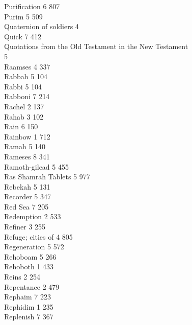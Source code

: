 Purification \hfill 6 \quad \phantom{0}807\\
Purim \hfill 5 \quad \phantom{0}509\\
Quaternion of soldiers \hfill 4 \\
Quick \hfill 7 \quad \phantom{0}412\\
Quotations from the Old Testament in the New Testament \\ \mbox{} \hfill 5 \\
Raamses \hfill 4 \quad \phantom{0}337\\
Rabbah \hfill 5 \quad \phantom{0}104\\
Rabbi \hfill 5 \quad \phantom{0}104\\
Rabboni \hfill 7 \quad \phantom{0}214\\
Rachel \hfill 2 \quad \phantom{0}137\\
Rahab \hfill 3 \quad \phantom{0}102\\
Rain \hfill 6 \quad \phantom{0}150\\
Rainbow \hfill 1 \quad \phantom{0}712\\
Ramah \hfill 5 \quad \phantom{0}140\\
Rameses \hfill 8 \quad \phantom{0}341\\
Ramoth-gilead \hfill 5 \quad \phantom{0}455\\
Ras Shamrah Tablets \hfill 5 \quad \phantom{0}977\\
Rebekah \hfill 5 \quad \phantom{0}131\\
Recorder \hfill 5 \quad \phantom{0}347\\
Red Sea \hfill 7 \quad \phantom{0}205\\
Redemption \hfill 2 \quad \phantom{0}533\\
Refiner \hfill 3 \quad \phantom{0}255\\
Refuge; cities of \hfill 4 \quad \phantom{0}805\\
Regeneration \hfill 5 \quad \phantom{0}572\\
Rehoboam \hfill 5 \quad \phantom{0}266\\
Rehoboth \hfill 1 \quad \phantom{0}433\\
Reins \hfill 2 \quad \phantom{0}254\\
Repentance \hfill 2 \quad \phantom{0}479\\
Rephaim \hfill 7 \quad \phantom{0}223\\
Rephidim \hfill 1 \quad \phantom{0}235\\
Replenish \hfill 7 \quad \phantom{0}367\\
